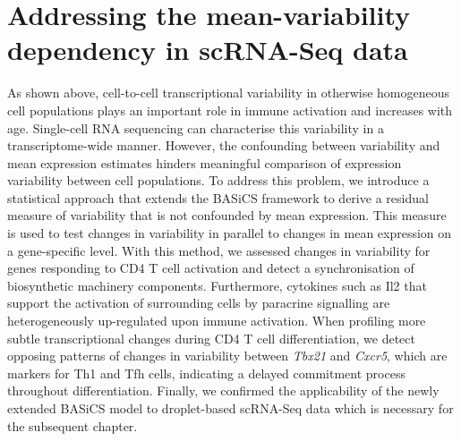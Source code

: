 
\chapter{Addressing the mean-variability dependency in scRNA-Seq data}  

\graphicspath{{"../../Dropbox (Cambridge  University)/Figures_for_thesis/Chapter2/"}}

\vfill

\begin{Abstract}
As shown above, cell-to-cell transcriptional variability in otherwise homogeneous cell populations plays an important role in immune activation and increases with age. Single-cell RNA sequencing can characterise this variability in a transcriptome-wide manner. However, the confounding between variability and mean expression estimates hinders meaningful comparison of expression variability between cell populations. To address this problem, we introduce a statistical approach that extends the BASiCS framework to derive a residual measure of variability that is not confounded by mean expression. This measure is used to test changes in variability in parallel to changes in mean expression on a gene-specific level. With this method, we assessed changes in variability for genes responding to CD4\plus{} T cell activation and detect a synchronisation of biosynthetic machinery components. Furthermore, cytokines such as Il2 that support the activation of surrounding cells by paracrine signalling are heterogeneously up-regulated upon immune activation. When profiling more subtle transcriptional changes during CD4\plus{} T cell differentiation, we detect opposing patterns of changes in variability between \textit{Tbx21} and \textit{Cxcr5}, which are markers for Th1 and Tfh cells, indicating a delayed commitment process throughout differentiation. Finally, we confirmed the applicability of the newly extended BASiCS model to droplet-based scRNA-Seq data which is necessary for the subsequent chapter.
\end{Abstract}

\vfill

\newpage

